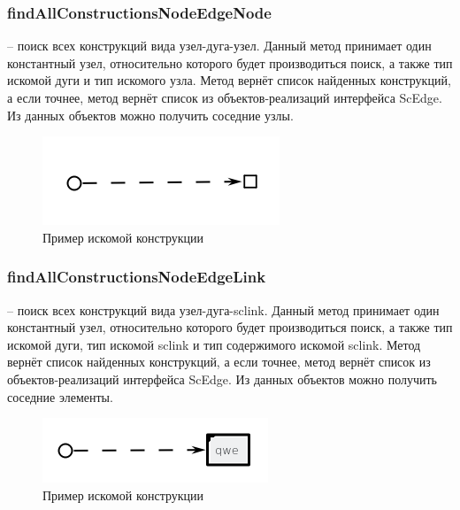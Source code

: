 \subsubsection {findAllConstructionsNodeEdgeNode} -- поиск всех конструкций вида узел-дуга-узел. Данный метод принимает один константный узел, относительно которого будет производиться поиск, а также тип искомой дуги и тип искомого узла. Метод вернёт список найденных конструкций, а если точнее, метод вернёт список из объектов-реализаций интерфейса ScEdge. Из данных объектов можно получить соседние узлы. 
\begin{figure}[H]
    \centering
    \includegraphics{images/sc-context/node-edge-node.png}
    \caption{Пример искомой конструкции}
    \label{json_ex}
\end{figure}
\subsubsection {findAllConstructionsNodeEdgeLink} -- поиск всех конструкций вида узел-дуга-sclink. Данный метод принимает один константный узел, относительно которого будет производиться поиск, а также тип искомой дуги, тип искомой sclink и тип содержимого искомой sclink. Метод вернёт список найденных конструкций, а если точнее, метод вернёт список из объектов-реализаций интерфейса ScEdge. Из данных объектов можно получить соседние элементы. 
\begin{figure}[H]
    \centering
    \includegraphics{images/sc-context/node-edge-link.png}
    \caption{Пример искомой конструкции}
    \label{json_ex}
\end{figure}

